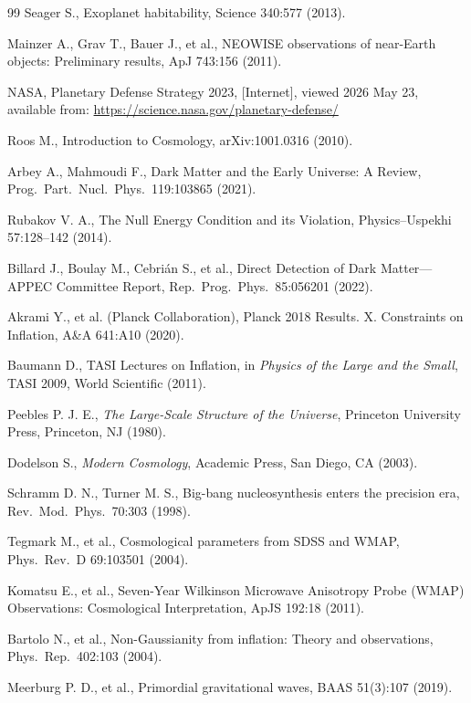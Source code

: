 \begin{thebibliography}{99}
Seager S., Exoplanet habitability, Science 340:577 (2013).

Mainzer A., Grav T., Bauer J., et al., NEOWISE observations of near-Earth objects: Preliminary results, ApJ 743:156 (2011).

NASA, Planetary Defense Strategy 2023, [Internet], viewed 2026 May 23, available from: \url{https://science.nasa.gov/planetary-defense/}

Roos M., Introduction to Cosmology, arXiv:1001.0316 (2010).

Arbey A., Mahmoudi F., Dark Matter and the Early Universe: A Review, Prog.\ Part.\ Nucl.\ Phys.\ 119:103865 (2021).

Rubakov V. A., The Null Energy Condition and its Violation, Physics--Uspekhi 57:128--142 (2014).

Billard J., Boulay M., Cebri\'{a}n S., et al., Direct Detection of Dark Matter---APPEC Committee Report, Rep.\ Prog.\ Phys.\ 85:056201 (2022).

Akrami Y., et al. (Planck Collaboration), Planck 2018 Results. X. Constraints on Inflation, A\&A 641:A10 (2020).

Baumann D., TASI Lectures on Inflation, in \textit{Physics of the Large and the Small}, TASI 2009, World Scientific (2011).

Peebles P. J. E., \textit{The Large-Scale Structure of the Universe}, Princeton University Press, Princeton, NJ (1980).

Dodelson S., \textit{Modern Cosmology}, Academic Press, San Diego, CA (2003).

Schramm D. N., Turner M. S., Big-bang nucleosynthesis enters the precision era, Rev.\ Mod.\ Phys.\ 70:303 (1998).

Tegmark M., et al., Cosmological parameters from SDSS and WMAP, Phys.\ Rev.\ D 69:103501 (2004).

Komatsu E., et al., Seven-Year Wilkinson Microwave Anisotropy Probe (WMAP) Observations: Cosmological Interpretation, ApJS 192:18 (2011).

Bartolo N., et al., Non-Gaussianity from inflation: Theory and observations, Phys.\ Rep.\ 402:103 (2004).

Meerburg P. D., et al., Primordial gravitational waves, BAAS 51(3):107 (2019).


\end{thebibliography}

